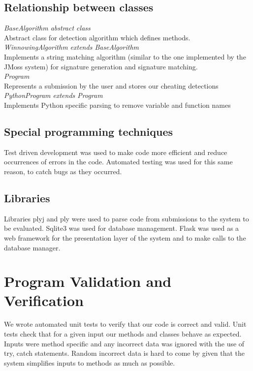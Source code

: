 \documentclass[11pt,a4paper]{article}
\begin{document}
\subsection{Relationship between classes}

\textit{BaseAlgorithm abstract class}\\ 
Abstract class for detection algorithm which defines methods.\\

\textit{WinnowingAlgorithm extends BaseAlgorithm}\\
Implements a string matching algorithm (similar to the one implemented by the
JMoss system) for signature generation and signature matching.\\

\textit{Program}\\
Represents a submission by the user and stores our cheating detections\\

\textit{PythonProgram extends Program}\\
Implements Python specific parsing to remove variable and function names\\

\subsection{Special programming techniques}

Test driven development was used to make code more efficient and reduce occurrences of errors in the code. Automated testing was used for this same reason, to catch bugs as they occurred.

\subsection{Libraries}

Libraries plyj and  ply were used to parse code from submissions to the system to be evaluated. Sqlite3 was used for database management. Flask was used as a web framework for the presentation layer of the system and to make calls to the database manager.


\section{Program Validation and Verification}
\label{ss:progr-valid-verif}

We wrote automated unit tests to verify that our code is correct and valid. Unit tests check that for a given input our methods and classes behave as expected. Inputs were method specific and any incorrect data was ignored with the use of try, catch statements. Random incorrect data is hard to come by given that the system simplifies inputs to methods as much as possible. 
\end{document}
